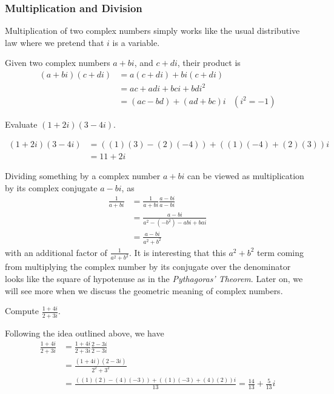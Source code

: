 \subsubsection{Multiplication and Division}
Multiplication of two complex numbers simply works like the usual distributive law where we pretend that $i$ is a variable.
\begin{defn}
Given two complex numbers $a + bi$, and $c + di$, their product is
\begin{align}
(a + bi)(c + di) &= a(c + di) + bi(c + di) \nonumber\\
&= ac + adi + bci + bdi^2 \nonumber \\
&= (ac - bd) + (ad + bc)i & (i^2 = -1)
\end{align}
\end{defn}

\begin{exmp}
Evaluate $(1+2i)(3-4i)$.
\end{exmp}
\begin{solution}
\begin{align*}
(1+2i)(3-4i) &= ((1)(3) - (2)(-4)) + ((1)(-4) + (2)(3))i \\
&= 11 + 2i 
\end{align*}
\end{solution}

Dividing something by a complex number $a+bi$ can be viewed as multiplication by its complex conjugate $a-bi$, as
\begin{align}
\frac{1}{a+bi} &= \frac{1}{a+bi}\frac{a-bi}{a-bi} \nonumber \\
&= \frac{a-bi}{a^2 - (-b^2) - abi + bai} \nonumber \\
&= \frac{a-bi}{a^2 + b^2}
\end{align}
with an additional factor of $\frac{1}{a^2+b^2}$. It is interesting that this $a^2+b^2$ term coming from multiplying the complex number by its conjugate over the denominator looks like the square of hypotenuse as in the \textit{Pythagoras' Theorem}. Later on, we will see more when we discuss the geometric meaning of complex numbers.

\begin{exmp}
Compute $\frac{1+4i}{2+3i}$.
\end{exmp}
\begin{solution}
Following the idea outlined above, we have
\begin{align*}
\frac{1+4i}{2+3i} &= \frac{1+4i}{2+3i}\frac{2-3i}{2-3i} \\
&= \frac{(1+4i)(2-3i)}{2^2+3^2} \\
&= \frac{((1)(2) - (4)(-3)) + ((1)(-3) + (4)(2))i}{13} = \frac{14}{13}+\frac{5}{13}i
\end{align*}
\end{solution}

